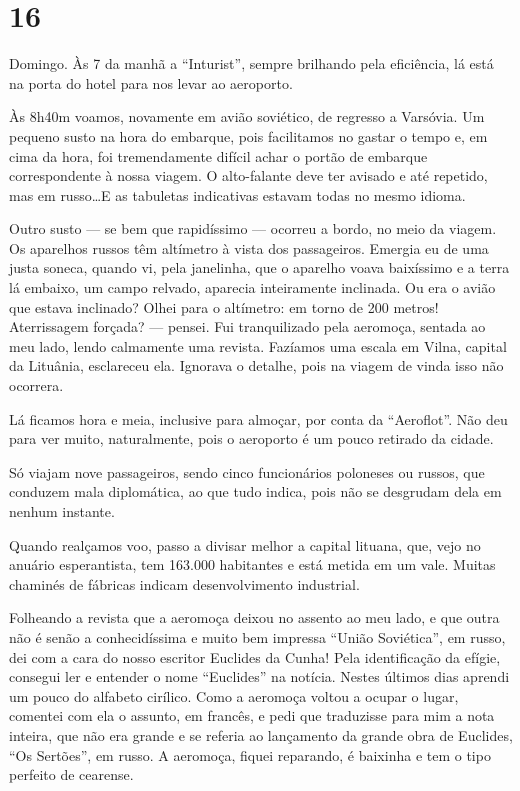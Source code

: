\section*{16 \adfflatleafright {}}
Domingo. Às 7 da manhã a ``Inturist'', sempre brilhando pela eficiência, lá está na porta do hotel para nos levar ao aeroporto.

Às 8h40m voamos, novamente em avião soviético, de regresso a Varsóvia. Um pequeno susto na hora do embarque, pois facilitamos no gastar o tempo e, em cima da hora, foi tremendamente difícil achar o portão de embarque correspondente à nossa viagem. O alto-falante deve ter avisado e até repetido, mas em russo\ldots E as tabuletas indicativas estavam todas no mesmo idioma.

Outro susto --- se bem que rapidíssimo --- ocorreu a bordo, no meio da viagem. Os aparelhos russos têm altímetro à vista dos passageiros. Emergia eu de uma justa soneca, quando vi, pela janelinha, que o aparelho voava baixíssimo e a terra lá embaixo, um campo relvado, aparecia inteiramente inclinada. Ou era o avião que estava inclinado? Olhei para o altímetro: em torno de 200 metros! Aterrissagem forçada? --- pensei. Fui tranquilizado pela aeromoça, sentada ao meu lado, lendo calmamente uma revista. Fazíamos uma escala em Vilna, capital da Lituânia, esclareceu ela. Ignorava o detalhe, pois na viagem de vinda isso não ocorrera.

Lá ficamos hora e meia, inclusive para almoçar, por conta da ``Aeroflot''. Não deu para ver muito, naturalmente, pois o aeroporto é um pouco retirado da cidade.

Só viajam nove passageiros, sendo cinco funcionários poloneses ou russos, que conduzem mala diplomática, ao que tudo indica, pois não se desgrudam dela em nenhum instante.

Quando realçamos voo, passo a divisar melhor a capital lituana, que, vejo no anuário esperantista, tem 163.000 habitantes e está metida em um vale. Muitas chaminés de fábricas indicam desenvolvimento industrial.

Folheando a revista que a aeromoça deixou no assento ao meu lado, e que outra não é senão a conhecidíssima e muito bem impressa ``União Soviética'', em russo, dei com a cara do nosso escritor Euclides da Cunha! Pela identificação da efígie, consegui ler e entender o nome ``Euclides'' na notícia. Nestes últimos dias aprendi um pouco do alfabeto cirílico. Como a aeromoça voltou a ocupar o lugar, comentei com ela o assunto, em francês, e pedi que traduzisse para mim a nota inteira, que não era grande e se referia ao lançamento da grande obra de Euclides, ``Os Sertões'', em russo. A aeromoça, fiquei reparando, é baixinha e tem o tipo perfeito de cearense.

